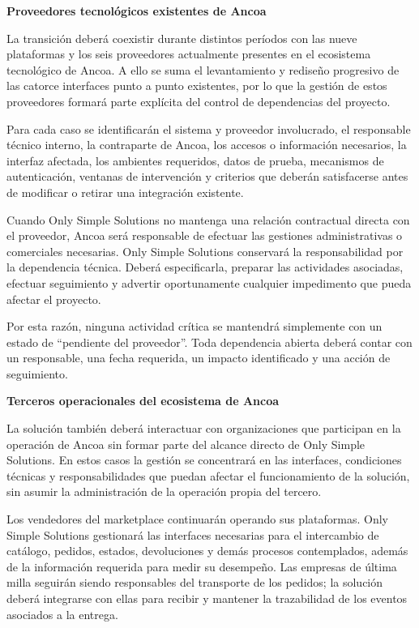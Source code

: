 \documentclass[11pt]{article}
\begin{document}
\textbf{Proveedores tecnológicos existentes de Ancoa}

La transición deberá coexistir durante distintos períodos con las nueve
plataformas y los seis proveedores actualmente presentes en el
ecosistema tecnológico de Ancoa. A ello se suma el levantamiento y
rediseño progresivo de las catorce interfaces punto a punto existentes,
por lo que la gestión de estos proveedores formará parte explícita del
control de dependencias del proyecto.

Para cada caso se identificarán el sistema y proveedor involucrado, el
responsable técnico interno, la contraparte de Ancoa, los accesos o
información necesarios, la interfaz afectada, los ambientes requeridos,
datos de prueba, mecanismos de autenticación, ventanas de intervención y
criterios que deberán satisfacerse antes de modificar o retirar una
integración existente.

Cuando Only Simple Solutions no mantenga una relación contractual
directa con el proveedor, Ancoa será responsable de efectuar las
gestiones administrativas o comerciales necesarias. Only Simple
Solutions conservará la responsabilidad por la dependencia técnica.
Deberá especificarla, preparar las actividades asociadas, efectuar
seguimiento y advertir oportunamente cualquier impedimento que pueda
afectar el proyecto.

Por esta razón, ninguna actividad crítica se mantendrá simplemente con
un estado de ``pendiente del proveedor''. Toda dependencia abierta
deberá contar con un responsable, una fecha requerida, un impacto
identificado y una acción de seguimiento.

\textbf{Terceros operacionales del ecosistema de Ancoa}

La solución también deberá interactuar con organizaciones que participan
en la operación de Ancoa sin formar parte del alcance directo de Only
Simple Solutions. En estos casos la gestión se concentrará en las
interfaces, condiciones técnicas y responsabilidades que puedan afectar
el funcionamiento de la solución, sin asumir la administración de la
operación propia del tercero.

Los vendedores del marketplace continuarán operando sus plataformas.
Only Simple Solutions gestionará las interfaces necesarias para el
intercambio de catálogo, pedidos, estados, devoluciones y demás procesos
contemplados, además de la información requerida para medir su
desempeño. Las empresas de última milla seguirán siendo responsables del
transporte de los pedidos; la solución deberá integrarse con ellas para
recibir y mantener la trazabilidad de los eventos asociados a la
entrega.
\end{document}
